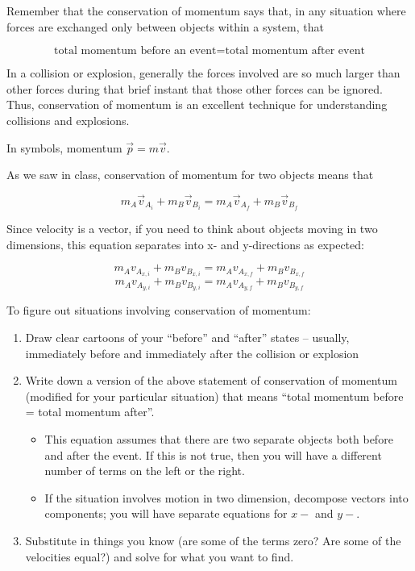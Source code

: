 \documentclass[12pt]{article}
\begin{document}
\Large
\centerline{}

\normalsize
\centerline{}

Remember that the conservation of momentum says that, in any situation where forces are exchanged only between objects within a system, that

$$\text{total momentum before an event} = \text {total momentum after event}$$

In a collision or explosion, generally the forces involved are so much larger than other forces during that brief instant that those other forces can be ignored. Thus, conservation of momentum is an excellent technique for understanding collisions and explosions.

In symbols, momentum $\vec p = m \vec v$. 

As we saw in class, conservation of momentum for two objects means that 

$$m_A \vec v_{A_i} + m_B \vec v_{B_i} = m_A \vec v_{A_f} + m_B \vec v_{B_f}$$

Since velocity is a vector, if you need to think about objects moving in two dimensions, this equation
separates into x- and y-directions as expected:

$$m_A v_{A_{x,i}} + m_B v_{B_{x,i}} = m_A v_{A_{x,f}} + m_B v_{B_{x,f}}$$
$$m_A v_{A_{y,i}} + m_B v_{B_{y,i}} = m_A v_{A_{y,f}} + m_B v_{B_{y,f}}$$


To figure out situations involving conservation of momentum:

\begin{enumerate}
	\item Draw clear cartoons of your ``before'' and ``after'' states -- usually, immediately before and immediately after the collision or explosion
	\item Write down a version of the above statement of conservation of momentum (modified for your particular situation) that means ``total momentum before = total momentum after''. 
	\begin{itemize}
		\item This equation assumes that there are two separate objects both before and after the event. If this is not true, then you will have a different number of terms on the left or the right.
		\item If the situation involves motion in two dimension, decompose vectors into components; you will have separate equations for $x-$ and $y-$.
	\end{itemize}
	\item Substitute in things you know (are some of the terms zero? Are some of the velocities equal?) and solve for what you want to find.
\end{enumerate}
\end{document}

